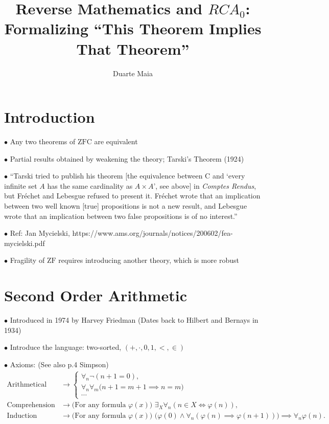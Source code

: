 \documentclass{article}
\title{Reverse Mathematics and $RCA_0$: Formalizing ``This Theorem Implies That Theorem''}
\author{Duarte Maia}
\theoremstyle{nonumberplain}
\newcommand{\ZFC}{\mathrm{ZFC}}
\newcommand{\ZF}{\mathrm{ZF}}
\newcommand{\Choice}{\mathrm{C}}
\newcommand\point[1]{\noindent \hspace{\labelsep} $\bullet$ #1 \smallskip}
\newcommand\timestamp[1]{}
\begin{document}
\maketitle

\section{Introduction}

\point{Any two theorems of $\ZFC$ are equivalent}

\point{Partial results obtained by weakening the theory; Tarski's Theorem (1924)}

\point{``Tarski tried to publish his theorem [the equivalence between $\Choice$ and `every infinite set $A$ has the same cardinality as $A \times A$', see above] in \textit{Comptes Rendus}, but Fréchet and Lebesgue refused to present it. Fréchet wrote that an implication between two well known [true] propositions is not a new result, and Lebesgue wrote that an implication between two false propositions is of no interest.''}

\point{Ref: Jan Mycielski, https://www.ams.org/journals/notices/200602/fea-mycielski.pdf}

\point{Fragility of $\ZF$ requires introducing another theory, which is more robust}

\section{Second Order Arithmetic}

\point{Introduced in 1974 by Harvey Friedman (Dates back to Hilbert and Bernays in 1934)}

\timestamp{7 minutes}

\point{Introduce the language: two-sorted, $(+,\cdot,0,1,<,\in)$}

\point{Axioms: (See also p.4 Simpson)}
\begin{equation}
\begin{aligned}
\text{Arithmetical Axioms} &\rightarrow \begin{cases}
\forall_n \neg (n+1 = 0),\\
\forall_n \forall_m \big( n+1 = m+1 \implies n=m \big)\\
\cdots
\end{cases}\\
\text{Comprehension} &\rightarrow \text{(For any formula $\varphi(x)$) } \exists_X \forall_n (n \in X \iff \varphi(n)),\\
\text{Induction} &\rightarrow \text{(For any formula $\varphi(x)$) } \big(\varphi(0) \land \forall_n (\varphi(n) \implies \varphi(n+1)) \big) \implies \forall_n \varphi(n).
\end{aligned}
\end{equation}
\end{document}
